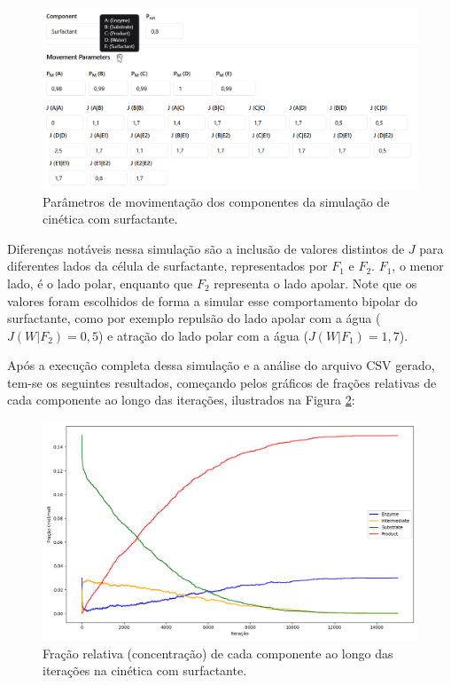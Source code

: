 \documentclass[12pt,oneside]{report}
\begin{document}
\begin{figure}[H]
    \centering
    \includegraphics[width=1\textwidth]{movement_MM_surfactant.png}
    \caption{\small Parâmetros de movimentação dos componentes da simulação de cinética com surfactante.}
    \label{fig:michaelis_menten_movement_surfactante}
\end{figure}

Diferenças notáveis nessa simulação são a inclusão de valores distintos de $J$ para diferentes lados da célula de surfactante, representados por $F_1$ e $F_2$. $F_1$, o menor lado, é o lado polar, enquanto que $F_2$ representa o lado apolar. Note que os valores foram escolhidos de forma a simular esse comportamento bipolar do surfactante, como por exemplo repulsão do lado apolar com a água ($J (W|F_2) = 0{,}5$) e atração do lado polar com a água ($J (W|F_1) = 1{,}7$).

Após a execução completa dessa simulação e a análise do arquivo CSV gerado, tem-se os seguintes resultados, começando pelos gráficos de frações relativas de cada componente ao longo das iterações, ilustrados na Figura \ref{fig:MM_surf_conc}:

\begin{figure}[H]
    \centering
    \includegraphics[width=1\textwidth]{MM_surf_conc.png}
    \caption{\small Fração relativa (concentração) de cada componente ao longo das iterações na cinética com surfactante.}
    \label{fig:MM_surf_conc}
\end{figure}
\end{document}
